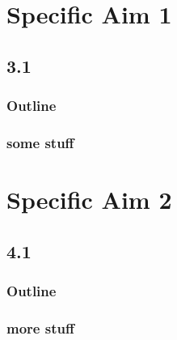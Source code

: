 \documentclass{beamer}
\begin{document}
\section{Specific Aim 1}
 \subsection{3.1}
\begin{frame}
\frametitle{Outline}
\tableofcontents[currentsection]
\end{frame}
       
   
    \begin{frame}
        \frametitle{some stuff}
    \end{frame}
    
    
\section{Specific Aim 2}
 \subsection{4.1}
\begin{frame}
\frametitle{Outline}
\tableofcontents[currentsection]
\end{frame}
       
  
    \begin{frame}
        \frametitle{more stuff}
    \end{frame}

     
\end{document}

